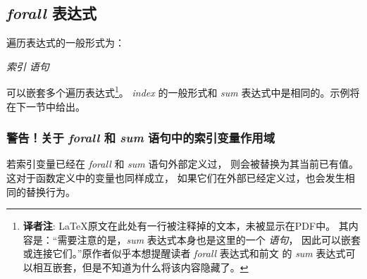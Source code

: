 \subsection{\emph{forall} 表达式}
遍历表达式的一般形式为：

\smallskip
{} \emph{索引}  \emph{语句}

\smallskip
\noindent 可以嵌套多个遍历表达式\footnote{
  \textbf{译者注}: \LaTeX{}原文在此处有一行被注释掉的文本，未被显示在PDF中。
  其内容是：“需要注意的是，\emph{sum} 表达式本身也是这里的一个 \emph{语句}，
  因此可以嵌套或连接它们。”原作者似乎本想提醒读者 \emph{forall} 表达式和前文
  的 \emph{sum} 表达式可以相互嵌套，但是不知道为什么将该内容隐藏了。
}。
\emph{index} 的一般形式和 \emph{sum} 表达式中是相同的。示例将在下一节中给出。

\subsubsection{警告！关于 \emph{forall} 和 \emph{sum} 语句中的索引变量作用域}
若索引变量已经在 \emph{forall} 和 \emph{sum} 语句外部定义过，
则会被替换为其当前已有值。这对于函数定义中的变量也同样成立，
如果它们在外部已经定义过，也会发生相同的替换行为。

